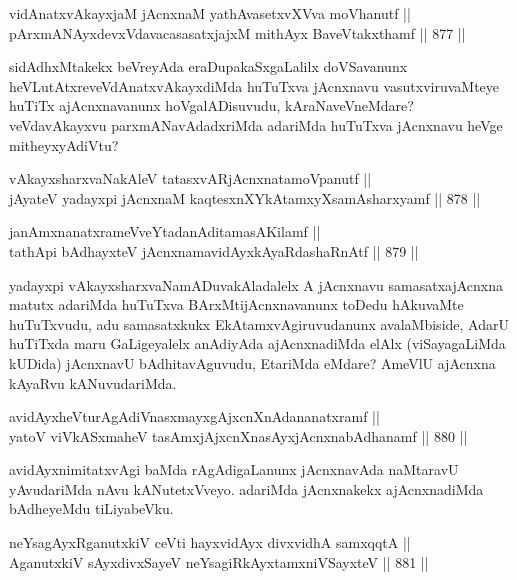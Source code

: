 \begin{shl}
vidAnatxvAkayxjaM jAcnxnaM yathAvasetxvXVva moVhanutf || \\
pArxmANAyxdevxVdavacasasatxjajxM mithAyx BaveVtakxthamf \hfill || 877 ||  
\end{shl}

\begin{artha}
sidAdhxMtakekx beVreyAda eraDupakaSxgaLalilx doVSavanunx heVLutAtxre\ndash  veVdAnatxvAkayxdiMda huTuTxva jAcnxnavu vasutxviruvaMteye huTiTx ajAcnxnavanunx hoVgalADisuvudu, kAraNaveVneMdare? veVdavAkayxvu parxmANavAdadxriMda adariMda huTuTxva jAcnxnavu heVge mitheyxyAdiVtu?
\end{artha}


\begin{shl}
vAkayxsharxvaNakAleV tatasxvARjAcnxnatamoVpanutf || \\
jAyateV yadayxpi jAcnxnaM kaqtesxnXYkAtamxyXsamAsharxyamf \hfill || 878 ||  
\end{shl}
				
\begin{shl}
janAmxnanatxrameVveYtadanAditamasA\s Kilamf || \\
tathA\s pi bAdhayxteV jAcnxnamavidAyxkAyaRdashaRnAtf \hfill || 879 ||  
\end{shl}

\begin{artha}
yadayxpi vAkayxsharxvaNamADuvakAladalelx A jAcnxnavu samasatxajAcnxna matutx adariMda huTuTxva BArxMtijAcnxnavanunx toDedu hAkuvaMte huTuTxvudu, adu samasatxkukx EkAtamxvAgiruvudanunx avalaMbiside, AdarU huTiTxda maru GaLigeyalelx anAdiyAda ajAcnxnadiMda elAlx (viSayagaLiMda kUDida) jAcnxnavU bAdhitavAguvudu, EtariMda eMdare? AmeVlU ajAcnxna kAyaRvu kANuvudariMda.
\end{artha}

\begin{shl}
avidAyxheVturAgAdiVnasxmayxgAjxcnXnAdananatxramf || \\
yatoV viVkASxmaheV tasAmxjAjxcnXnasAyxjAcnxnabAdhanamf \hfill || 880 ||  
\end{shl}

\begin{artha}
avidAyxnimitatxvAgi baMda rAgAdigaLanunx jAcnxnavAda naMtaravU yAvudariMda nAvu kANutetxVveyo. adariMda jAcnxnakekx ajAcnxnadiMda bAdheyeMdu tiLiyabeVku.
\end{artha}

\begin{shl}
neYsagAyxRganutxkiV ceVti hayxvidAyx divxvidhA samxqqtA || \\
AganutxkiV sAyxdivxSayeV neYsagiRkAyxtamxniVSayxteV \hfill || 881 ||  
\end{shl}

